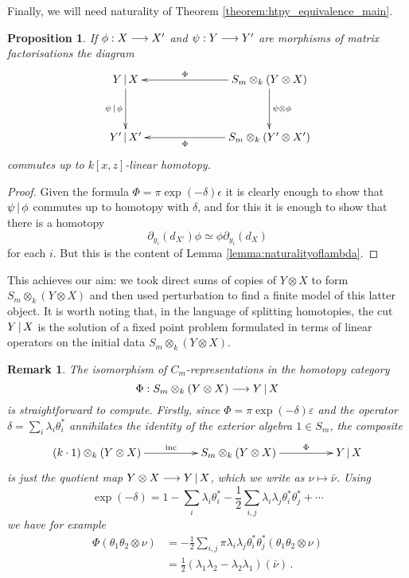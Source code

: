 \documentclass[english,letter paper,12pt,leqno]{article}
\newtheorem{proposition}[theorem]{Proposition}
\theoremstyle{example}
\newtheorem{remark}[theorem]{Remark}
\numberwithin{equation}{section}
\def\be{\begin{equation}}
\def\ee{\end{equation}}
\begin{document}
Finally, we will need naturality of Theorem \ref{theorem:htpy_equivalence_main}.

\begin{proposition}\label{prop:naturality_main_thm} If $\phi: X \longrightarrow X'$ and $\psi: Y \longrightarrow Y'$ are morphisms of matrix factorisations the diagram
\begin{equation}\label{eq:final_finite_naturality}
\xymatrix@C+4pc@R+1pc{
Y \l X \ar[d]_-{\psi \l \phi} & S_m \otimes_k ( Y \otimes X )\ar[l]_-{\Phi} \ar[d]^-{\psi \otimes \phi}\\
Y' \l X' & S_m \otimes_k ( Y' \otimes X' )\ar[l]^-{\Phi}
}
\end{equation}
commutes up to $k[x,z]$-linear homotopy.
\end{proposition}
\begin{proof}
Given the formula $\Phi = \pi \exp(-\delta) \epsilon$ it is clearly enough to show that $\psi \,|\, \phi$ commutes up to homotopy with $\delta$, and for this it is enough to show that there is a homotopy
\[
\partial_{y_i}(d_{X'}) \phi \simeq \phi \partial_{y_i}(d_X)
\]
for each $i$. But this is the content of Lemma \ref{lemma:naturalityoflambda}.
\end{proof}

This achieves our aim: we took direct sums of copies of $Y \otimes X$ to form $S_m \otimes_k( Y \otimes X )$ and then used perturbation to find a finite model of this latter object. It is worth noting that, in the language of splitting homotopies, the cut $Y \,|\, X$ is the solution of a fixed point problem formulated in terms of linear operators on the initial data $S_m \otimes_k( Y \otimes X )$. 

\begin{remark} The isomorphism of $C_m$-representations in the homotopy category
\[
\Phi: S_m \otimes_k (Y \otimes X) \longrightarrow Y \,|\, X
\]
is straightforward to compute. Firstly, since $\Phi = \pi \exp(-\delta) \varepsilon$ and the operator $\delta = \sum_i \lambda_i \theta_i^*$ annihilates the identity of the exterior algebra $1 \in S_m$, the composite
\be
\xymatrix@C+2pc{
( k \cdot 1 ) \otimes_k ( Y \otimes X ) \ar[r]^-{\operatorname{inc}} & S_m \otimes_k ( Y \otimes X ) \ar[r]^-{\Phi} & Y \l X
}
\ee
is just the quotient map $Y \otimes X \longrightarrow Y \,|\, X$, which we write as $\nu \mapsto \bar{\nu}$. Using
\[
\exp(-\delta) = 1 - \sum_i \lambda_i \theta_i^* - \frac{1}{2}\sum_{i,j} \lambda_i \lambda_j \theta_i^* \theta_j^* + \cdots
\]
we have for example
\begin{align*}
\Phi( \theta_1 \theta_2 \otimes \nu ) &= - \frac{1}{2} \sum_{i,j} \pi \lambda_i \lambda_j  \theta_i^* \theta_j^*( \theta_1 \theta_2 \otimes \nu )\\
&= \frac{1}{2}\left( \lambda_1 \lambda_2 -\lambda_2 \lambda_1 \right)( \bar{\nu} )\,.
\end{align*}
\end{remark}
\end{document}
